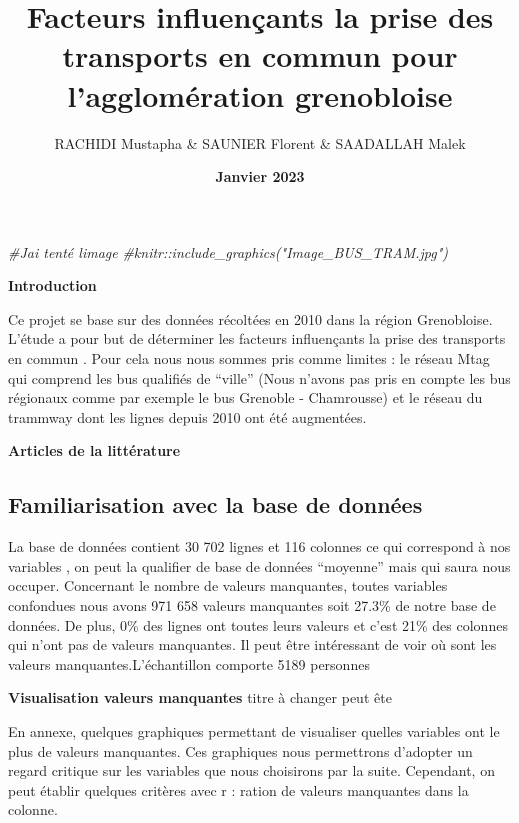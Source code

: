 \documentclass[
]{article}
\title{\textbf{Facteurs influençants la prise des transports en commun
pour l'agglomération grenobloise}}
\author{RACHIDI Mustapha \& SAUNIER Florent \& SAADALLAH Malek}
\date{\textbf{Janvier 2023}}
\newenvironment{Shaded}{\begin{snugshade}}{\end{snugshade}}
\newcommand{\CommentTok}[1]{\textcolor[rgb]{0.56,0.35,0.01}{\textit{#1}}}
\begin{document}
\maketitle

\begin{Shaded}
\begin{Highlighting}[]
\CommentTok{\#J\textquotesingle{}ai tenté l\textquotesingle{}image }
\CommentTok{\#knitr::include\_graphics("Image\_BUS\_TRAM.jpg")}
\end{Highlighting}
\end{Shaded}

\newpage

\textbf{Introduction}

Ce projet se base sur des données récoltées en 2010 dans la région
Grenobloise. L'étude a pour but de déterminer les facteurs influençants
la prise des transports en commun . Pour cela nous nous sommes pris
comme limites : le réseau Mtag qui comprend les bus qualifiés de
``ville'' (Nous n'avons pas pris en compte les bus régionaux comme par
exemple le bus Grenoble - Chamrousse) et le réseau du trammway dont les
lignes depuis 2010 ont été augmentées.\newline

\textbf{Articles de la littérature}

\hypertarget{familiarisation-avec-la-base-de-donnuxe9es}{%
\subsection{Familiarisation avec la base de
données}\label{familiarisation-avec-la-base-de-donnuxe9es}}

La base de données contient 30 702 lignes et 116 colonnes ce qui
correspond à nos variables , on peut la qualifier de base de données
``moyenne'' mais qui saura nous occuper. Concernant le nombre de valeurs
manquantes, toutes variables confondues nous avons 971 658 valeurs
manquantes soit 27.3\% de notre base de données. De plus, 0\% des lignes
ont toutes leurs valeurs et c'est 21\% des colonnes qui n'ont pas de
valeurs manquantes. Il peut être intéressant de voir où sont les valeurs
manquantes.\newline L'échantillon comporte 5189 personnes

\textbf{Visualisation valeurs manquantes} titre à changer peut ête

En annexe, quelques graphiques permettant de visualiser quelles
variables ont le plus de valeurs manquantes. Ces graphiques nous
permettrons d'adopter un regard critique sur les variables que nous
choisirons par la suite. Cependant, on peut établir quelques critères
avec r : ration de valeurs manquantes dans la colonne.
\end{document}

